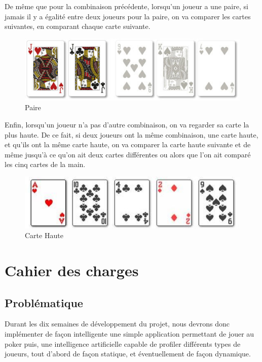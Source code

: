 \documentclass{report}
\begin{document}
De même que pour la combinaison précédente, lorsqu'un joueur a une paire, si jamais il y a égalité entre deux joueurs pour la paire, on va comparer les cartes suivantes, en comparant chaque carte suivante. \par
\newpage
		\begin{figure}[h]
			\begin{center}
				\includegraphics[scale=0.3]{./imagesRapport/paire.jpg}
			\end{center}
			\caption[Paire]{Paire}
		\end{figure}
		\medskip


Enfin, lorsqu'un joueur n'a pas d'autre combinaison, on va regarder sa carte la plus haute. De ce fait, si deux joueurs ont la même combinaison, une carte haute, et qu'ils ont la même carte haute, on va comparer la carte haute suivante et de même jusqu'à ce qu'on ait deux cartes différentes ou alors que l'on ait comparé les cinq cartes de la main. \par
		\begin{figure}[h]
			\begin{center}
				\includegraphics[scale=0.4]{./imagesRapport/carteHaute.jpg}
			\end{center}
			\caption[Carte Haute]{Carte Haute}
		\end{figure}
		\medskip

\section{Cahier des charges}
\subsection{Problématique}
\hspace{0.5cm}Durant les dix semaines de développement du projet, nous devrons donc implémenter de façon intelligente une simple application permettant de jouer au poker puis, une intelligence artificielle capable de profiler différents types de joueurs, tout d'abord de façon statique, et éventuellement de façon dynamique.
\end{document}
